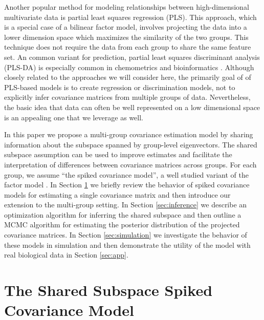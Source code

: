 \documentclass[12pt]{article}
\begin{document}

Another popular method for modeling relationships between
high-dimensional multivariate data is partial least squares regression
(PLS). This approach, which is a special case of a bilinear factor
model, involves projecting the data into a lower dimension space which
maximizes the similarity of the two groups.  This technique does not
require the data from each group to share the same feature set.  An
common variant for prediction, partial least squares discriminant
analysis (PLS-DA) is especially common in chemometrics and
bioinformatics \citep{Barker2003} .  Although closely related to the
approaches we will consider here, the primarily goal of of PLS-based
models is to create regression or discrimination models, not to
explicitly infer covariance matrices from multiple groups of data.
Nevertheless, the basic idea that data can often be well represented
on a low dimensional space is an appealing one that we leverage as
well.

In this paper we propose a multi-group covariance estimation model by
sharing information about the subspace spanned by group-level
eigenvectors.  The shared subspace assumption can be used to improve
estimates and facilitate the interpretation of differences between
covariance matrices across groups.  For each group, we assume ``the
spiked covariance model'', a well studied variant of the factor model
\citep{Johnstone2001}.  In Section \ref{sec:shared} we briefly review
the behavior of spiked covariance models for estimating a single
covariance matrix and then introduce our extension to the multi-group
setting.  In Section \ref{sec:inference} we describe an optimization
algorithm for inferring the shared subspace and then outline a MCMC
algorithm for estimating the posterior distribution of the projected
covariance matrices.  In Section \ref{sec:simulation} we
investigate the behavior of these models in simulation and then
demonstrate the utility of the model with real biological data in
Section \ref{sec:app}.

\section{The Shared Subspace Spiked Covariance Model}
\label{sec:shared}

\end{document}
